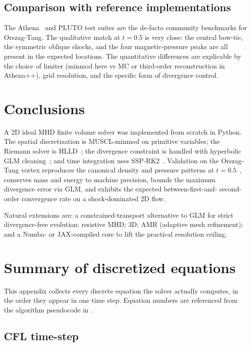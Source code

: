 \documentclass[11pt]{article}
\begin{document}
\subsection{Comparison with reference implementations}

The Athena~\cite{athena_orszag_tang} and PLUTO test suites are the de-facto community benchmarks for Orszag-Tang.  The qualitative match at $t = 0.5$ is very close: the central bow-tie, the symmetric oblique shocks, and the four magnetic-pressure peaks are all present in the expected locations.  The quantitative differences are explicable by the choice of limiter (minmod here vs MC or third-order reconstruction in Athena++), grid resolution, and the specific form of divergence control.

\section{Conclusions}

A 2D ideal MHD finite volume solver was implemented from scratch in Python.  The spatial discretization is MUSCL-minmod on primitive variables; the Riemann solver is HLLD~\cite{miyoshi2005}; the divergence constraint is handled with hyperbolic GLM cleaning~\cite{dedner2002}; and time integration uses SSP-RK2~\cite{shu1988}.  Validation on the Orszag-Tang vortex reproduces the canonical density and pressure patterns at $t = 0.5$~\cite{londrillo2000,athena_orszag_tang}, conserves mass and energy to machine precision, bounds the maximum divergence error via GLM, and exhibits the expected between-first-and- second-order convergence rate on a shock-dominated 2D flow.

Natural extensions are: a constrained-transport alternative to GLM for strict divergence-free evolution; resistive MHD; 3D; AMR (adaptive mesh refinement); and a Numba- or JAX-compiled core to lift the practical resolution ceiling.

\appendix

\section{Summary of discretized equations}
\label{app:discrete}

This appendix collects every discrete equation the solver actually computes, in the order they appear in one time step.  Equation numbers are referenced from the algorithm pseudocode in .

\subsection{CFL time-step}
\end{document}

